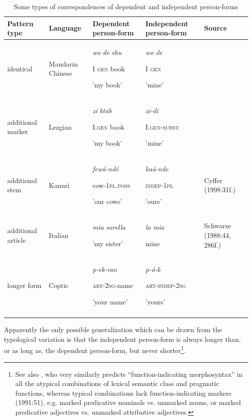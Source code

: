 \documentclass[output=paper]{langsci/langscibook}
\begin{document}
\begin{table}
\begin{tabularx}{\textwidth}{XXXXX}
\lsptoprule

\bfseries Pattern type & \bfseries Language & \bfseries Dependent person-form & \bfseries Independent person-form & \bfseries Source\\
\midrule
identical & Mandarin Chinese & \textit{wo}   \textit{de}  \textit{shu}

I   \textsc{gen}  book

'my book' & \textit{wo}  \textit{de~}

I  \textsc{gen}

'mine' & \\
additional marker & Lezgian & \textit{zi}  \textit{ktab}

I.\textsc{gen}  book

'my book' & \textit{zi-di}

I.\textsc{gen-subst}

'mine' & \citet[110]{Haspelmath1993}\\
additional stem & Kanuri & \textit{fewá-ndé}

cow-\textsc{1pl.poss}

'our cows' & \textit{kaá{}-nde}

\textsc{indep-1pl}

'ours' & Cyffer (1998:31f.)\\
additional article~ & Italian & \textit{mia sorella}

'my sister' & \textit{la mia}

mine & Schwarze (1988:44, 286f.)\\
longer form & Coptic & \textit{p-ek-ran}

\textsc{art-2sg}{}-name

'your name' & \textit{p-ô}\textit{{}-k}

\textsc{art-indep-2sg}

'yours' & \citet[277]{Haspelmath2015}\\
\lspbottomrule
\end{tabularx}

\caption{Some types of correspondences of dependent and independent person-forms}
\label{tab:1}
\end{table}

Apparently the only possible generalization which can be drawn from the typological variation is that the independent person-form is always longer than, or as long as, the dependent person-form, but never shorter\footnote{See also \citet{Croft1991}, who very similarly predicts “function-indicating morphosyntax” in all the atypical combinations of lexical semantic class and pragmatic functions, whereas typical combinations lack function-indicating markers (1991:51), e.g. marked predicative nominals vs. unmarked nouns, or marked predicative adjectives vs. unmarked attributive adjectives.}.
\end{document}
